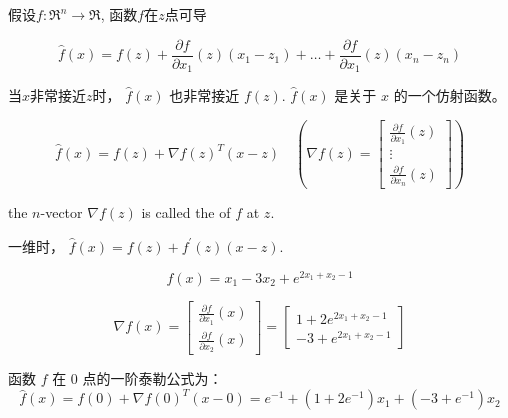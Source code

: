 \begin{definition}[一阶泰勒公式]
    假设$ f: \mathfrak{R}^{n} \rightarrow \mathfrak{R} $, 函数$f$在$z$点可导

    \begin{equation} \hat{f}(x)=f(z)+\frac{\partial f}{\partial x_{1}}(z)\left(x_{1}-z_{1}\right)+\ldots+\frac{\partial f}{\partial x_{1}}(z)\left(x_{n}-z_{n}\right) \end{equation}
\end{definition}

当$x$非常接近$z$时， $ \hat{f}(x) $ 也非常接近 $ f(z) $.  
$ \hat{f}(x) $ 是关于 $ x $ 的一个仿射函数。 

\begin{corollary}[一阶泰勒公式的内积形式]
    \begin{equation} \hat{f}(x)=f(z)+\nabla f(z)^{T}(x-z) \quad (\nabla f(z)=\left[\begin{array}{c}\frac{\partial f}{\partial x_{1}}(z) \\ \vdots \\ \frac{\partial f}{\partial x_{n}}(z)\end{array}\right]) \end{equation}

    the $ n $-vector $ \nabla f(z) $ is called the  of $ f $ at $ z $.
\end{corollary} 

一维时， $ \hat{f}(x)=f(z)+f^{\prime}(z)(x-z) $.

\begin{example}
    \begin{equation} f(x)=x_{1}-3 x_{2}+e^{2 x_{1}+x_{2}-1} \end{equation}

    \begin{equation} \nabla f(x)=\left[\begin{array}{l}\frac{\partial f}{\partial x_{1}}(x) \\ \frac{\partial f}{\partial x_{2}}(x)\end{array}\right]=\left[\begin{array}{l}1+2 e^{2 x_{1}+x_{2}-1} \\ -3+e^{2 x_{1}+x_{2}-1}\end{array}\right] \end{equation}

    函数 $ f $ 在 0 点的一阶泰勒公式为：
    \begin{equation} \hat{f}(x)=f(0)+\nabla f(0)^{T}(x-0)=e^{-1}+\left(1+2 e^{-1}\right) x_{1}+\left(-3+e^{-1}\right) x_{2} \end{equation}
\end{example}

